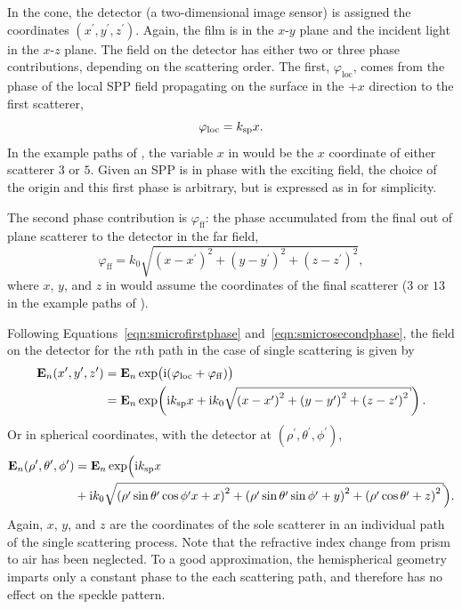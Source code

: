 In the cone, the detector (a two-dimensional image sensor) is assigned the
coordinates $(x^\prime,y^\prime,z^\prime)$.  Again, the film is in the
$x$-$y$ plane and the incident light in the $x$-$z$ plane.
The field on the detector has either two or three phase contributions,
depending on the scattering order. The first, $\varphi_\mathrm{loc}$, comes
from the phase of the local SPP field propagating on the surface in the
${+}x$ direction to the first scatterer,
\begin{equation}
\varphi_\mathrm{loc} = k_\mathrm{sp} x.
\label{eqn:smicrofirstphase}
\end{equation}
In the example paths of , the variable $x$ in
 would be the $x$
coordinate of either scatterer $3$ or $5$.  Given an SPP is in phase with the
exciting field, the choice of the origin and this first phase is arbitrary,
but is expressed as in  for simplicity.

The second phase contribution is $\varphi_\mathrm{ff}$: the phase accumulated
from the final out of plane scatterer to the detector in the far field,
\begin{equation}
\varphi_\mathrm{ff} =
k_0\sqrt{{(x-x^\prime)}^2+{(y-y^\prime)}^2+{(z-z^\prime)}^2},
\label{eqn:smicrosecondphase}
\end{equation}
where $x$, $y$, and $z$ in  would assume the coordinates of the final scatterer
($3$ or $13$ in the example paths of ).

Following Equations~\ref{eqn:smicrofirstphase} and~\ref{eqn:smicrosecondphase},
the field on the detector for the $n$th path in the case of single scattering is given by
\begin{align}
\mathbf{E}_n(x^\prime,y^\prime,z^\prime) &=
\mathbf{E}_n\exp\bigl(\mi(\varphi_\mathrm{loc}+\varphi_\mathrm{ff})\bigr)\\
&= \mathbf{E}_n\exp\!\left(\mi\ksp x + %
\mi k_0\sqrt{{(x-x^\prime)}^2+{(y-y^\prime)}^2+{(z-z^\prime)}^2}\right).
\label{eqn:smicrosinglescattering}
\end{align}
Or in spherical coordinates, with the detector at
$(\rho^\prime,\theta^\prime,\phi^\prime)$,
\begin{align}
				\mathbf{E}_n(\rho^\prime,\theta^\prime,\phi^\prime) &= \mathbf{E}_n\exp\Bigl(\mi\ksp x \\
&+ \mi k_0\sqrt{{(\rho^\prime\sin\theta^\prime\cos\phi^\prime
x+x)}^2+{(\rho^\prime\sin\theta^\prime\sin\phi^\prime+y)}^2+{(\rho^\prime\cos\theta^\prime+z)}^2
} \Bigr).
\label{eqn:scattspherical}
\end{align}
Again, $x$, $y$, and $z$ are the coordinates of the sole scatterer in an
individual path of the single scattering process.  Note that the
refractive index change from prism to air has been neglected.  To a good
approximation, the hemispherical geometry imparts only a constant phase to the
each scattering path, and therefore has no effect on the speckle pattern.


